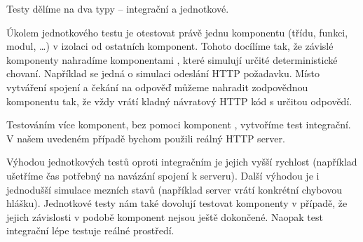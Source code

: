 Testy dělíme na dva typy -- integrační a jednotkové.

Úkolem jednotkového testu je otestovat právě jednu komponentu (třídu, funkci, modul, \ldots) v izolaci od ostatních komponent.
Tohoto docílíme tak, že závislé komponenty nahradíme komponentami , které simulují určité deterministické chovaní.
Například se jedná o simulaci odeslání HTTP požadavku.
Místo vytváření spojení a čekání na odpověď můžeme nahradit zodpovědnou komponentu tak, že vždy vrátí kladný návratový HTTP kód s určitou odpovědí.

Testováním více komponent, bez pomoci komponent , vytvoříme test integrační.
V našem uvedeném případě bychom použili reálný HTTP server.

Výhodou jednotkových testů oproti integračním je jejich vyšší rychlost (například ušetříme čas potřebný na navázání spojení k serveru).
Další výhodou je i jednodušší simulace mezních stavů (například server vrátí konkrétní chybovou hlášku).
Jednotkové testy nám také dovolují testovat komponenty v případě, že jejich závislosti v podobě komponent nejsou ještě dokončené.
Naopak test integrační lépe testuje reálné prostředí.

